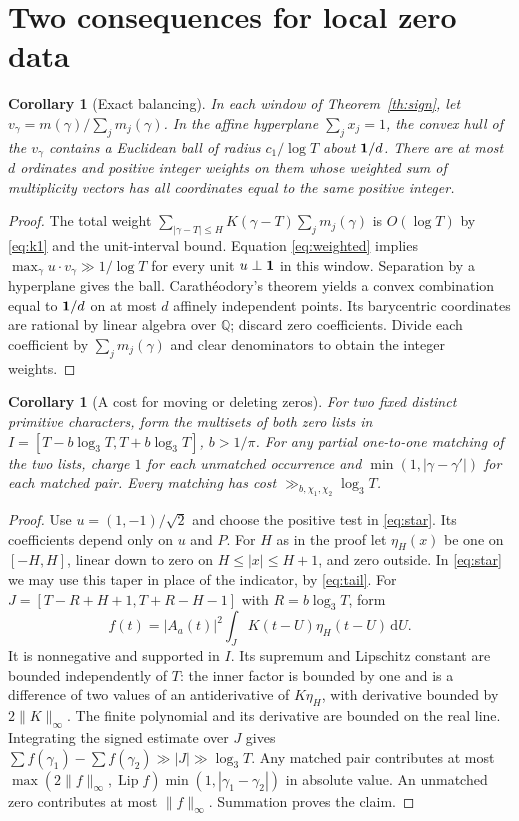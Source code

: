 \documentclass[11pt]{article}
\newtheorem{corollary}[theorem]{Corollary}
\newcommand{\dd}{\,\mathrm d}
\newcommand{\lthree}{\log_3 T}
\begin{document}
\section{Two consequences for local zero data}

\begin{corollary}[Exact balancing]\label{cor:conv}
In each window of Theorem~\ref{th:sign}, let
$v_\gamma=m(\gamma)/\sum_jm_j(\gamma)$. In the affine hyperplane
$\sum_j x_j=1$, the convex hull of the $v_\gamma$ contains a Euclidean
ball of radius $c_1/\log T$ about $\mathbf 1/d$.
There are at most $d$ ordinates and positive integer weights on them
whose weighted sum of multiplicity vectors has all coordinates equal
to the same positive integer.
\end{corollary}
\begin{proof}
The total weight $\sum_{|\gamma-T|\le H}K(\gamma-T)\sum_jm_j(\gamma)$
is $O(\log T)$ by \eqref{eq:k1} and the unit-interval bound.
Equation \eqref{eq:weighted} implies
$\max_\gamma u\cdot v_\gamma\gg1/\log T$ for every unit
$u\perp\mathbf 1$ in this window. Separation by a hyperplane gives the ball.
Carath\'eodory's theorem yields a convex combination equal to $\mathbf 1/d$
on at most $d$ affinely independent points. Its barycentric coordinates
are rational by linear algebra over $\mathbb Q$; discard zero coefficients.
Divide each coefficient by $\sum_jm_j(\gamma)$ and clear denominators
to obtain the integer weights.
\end{proof}

\begin{corollary}[A cost for moving or deleting zeros]\label{cor:transport}
For two fixed distinct primitive characters, form the multisets of both
zero lists in $I=[T-b\lthree,T+b\lthree]$, $b>1/\pi$. For any partial
one-to-one matching of the two lists, charge $1$ for each unmatched
occurrence and $\min(1,|\gamma-\gamma'|)$ for each matched pair. Every
matching has cost $\gg_{b,\chi_1,\chi_2}\lthree$.
\end{corollary}
\begin{proof}
Use $u=(1,-1)/\sqrt2$ and choose the positive test in \eqref{eq:star}.
Its coefficients depend only on $u$ and $P$. For $H$ as in the proof let
$\eta_H(x)$ be one on $[-H,H]$, linear down to zero on
$H\le |x|\le H+1$, and zero outside. In \eqref{eq:star} we may use this
taper in place of the indicator, by \eqref{eq:tail}. For
$J=[T-R+H+1,T+R-H-1]$ with $R=b\lthree$, form
\[
 f(t)=|A_a(t)|^2\int_J K(t-U)\eta_H(t-U)\dd U .
\]
It is nonnegative and supported in $I$. Its supremum and Lipschitz
constant are bounded independently of $T$: the inner factor is bounded
by one and is a difference of two values of an antiderivative of
$K\eta_H$, with derivative bounded by $2\|K\|_\infty$.
The finite polynomial and its derivative are bounded on the real line.
Integrating the signed estimate over $J$ gives
$\sum f(\gamma_1)-\sum f(\gamma_2)\gg |J|\gg\lthree$.
Any matched pair contributes at most
$\max(2\|f\|_\infty,\operatorname{Lip}f)\min(1,|\gamma_1-\gamma_2|)$
in absolute value. An unmatched zero contributes at most $\|f\|_\infty$.
Summation proves the claim.
\end{proof}
\end{document}
